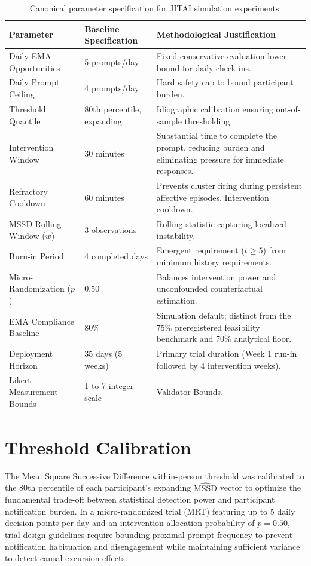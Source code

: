 \documentclass[11pt,letterpaper]{article}
\begin{document}
\begin{table}[htbp]
\centering
\small
\begin{tabular}{@{}lp{4.2cm}p{7.8cm}@{}}
\toprule
\textbf{Parameter} & \textbf{Baseline Specification} & \textbf{Methodological Justification} \\
\midrule
Daily EMA Opportunities & 5 prompts/day & Fixed conservative evaluation lower-bound for daily check-ins. \\
Daily Prompt Ceiling & 4 prompts/day & Hard safety cap to bound participant burden. \\
Threshold Quantile & 80th percentile, expanding & Idiographic calibration ensuring out-of-sample thresholding. \\
Intervention Window & 30 minutes & Substantial time to complete the prompt, reducing burden and eliminating pressure for immediate responses.\\
Refractory Cooldown & 60 minutes & Prevents cluster firing during persistent affective episodes. Intervention cooldown.\\
MSSD Rolling Window ($w$) & 3 observations & Rolling statistic capturing localized instability. \\
Burn-in Period & 4 completed days & Emergent requirement ($t \ge 5$) from minimum history requirements. \\
Micro-Randomization ($p$) & 0.50 & Balances intervention power and unconfounded counterfactual estimation. \\
EMA Compliance Baseline & 80\% & Simulation default; distinct from the 75\% preregistered feasibility benchmark and 70\% analytical floor. \\
Deployment Horizon & 35 days (5 weeks) & Primary trial duration (Week 1 run-in followed by 4 intervention weeks). \\
Likert Measurement Bounds & 1 to 7 integer scale & Validator Bounds. \\
\bottomrule
\end{tabular}
\caption{Canonical parameter specification for JITAI simulation experiments.}
\end{table}

\section{Threshold Calibration}

The Mean Square Successive Difference within-person threshold was calibrated to the 80th percentile of each participant's expanding $\widehat{\text{MSSD}}$ vector to optimize the fundamental trade-off between statistical detection power and participant notification burden. In a micro-randomized trial (MRT) featuring up to 5 daily decision points per day and an intervention allocation probability of $p = 0.50$, trial design guidelines require bounding proximal prompt frequency to prevent notification habituation and disengagement while maintaining sufficient variance to detect causal excursion effects.
\end{document}
